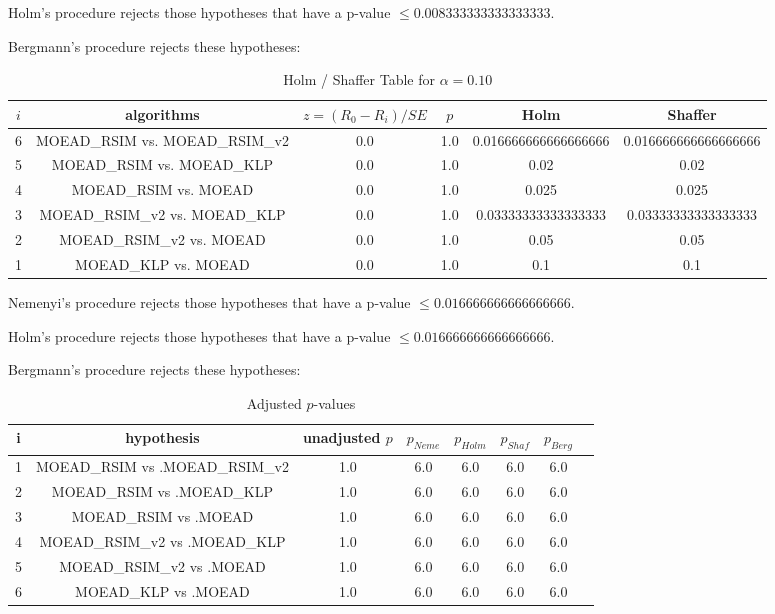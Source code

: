 \documentclass[a4paper,10pt]{article}
\begin{document}
\begin{landscape}
Holm's procedure rejects those hypotheses that have a p-value $\le0.008333333333333333$.


Bergmann's procedure rejects these hypotheses:


\begin{itemize}


\end{itemize}


\begin{table}[!htp]
\centering\tiny
\caption{Holm / Shaffer Table for $\alpha=0.10$}
\begin{tabular}{cccccc}
$i$&algorithms&$z=(R_0 - R_i)/SE$&$p$&Holm&Shaffer\\
\hline
6&MOEAD_RSIM vs. MOEAD_RSIM_v2&0.0&1.0&0.016666666666666666&0.016666666666666666\\
5&MOEAD_RSIM vs. MOEAD_KLP&0.0&1.0&0.02&0.02\\
4&MOEAD_RSIM vs. MOEAD&0.0&1.0&0.025&0.025\\
3&MOEAD_RSIM_v2 vs. MOEAD_KLP&0.0&1.0&0.03333333333333333&0.03333333333333333\\
2&MOEAD_RSIM_v2 vs. MOEAD&0.0&1.0&0.05&0.05\\
1&MOEAD_KLP vs. MOEAD&0.0&1.0&0.1&0.1\\
\hline
\end{tabular}
\end{table}
Nemenyi's procedure rejects those hypotheses that have a p-value $\le0.016666666666666666$.


Holm's procedure rejects those hypotheses that have a p-value $\le0.016666666666666666$.


Bergmann's procedure rejects these hypotheses:


\begin{itemize}


\end{itemize}


\begin{table}[!htp]
\centering\tiny
\caption{Adjusted $p$-values}
\begin{tabular}{cccccccc}
i&hypothesis&unadjusted $p$&$p_{Neme}$&$p_{Holm}$&$p_{Shaf}$&$p_{Berg}$\\
\hline
1&MOEAD_RSIM vs .MOEAD_RSIM_v2&1.0&6.0&6.0&6.0&6.0\\
2&MOEAD_RSIM vs .MOEAD_KLP&1.0&6.0&6.0&6.0&6.0\\
3&MOEAD_RSIM vs .MOEAD&1.0&6.0&6.0&6.0&6.0\\
4&MOEAD_RSIM_v2 vs .MOEAD_KLP&1.0&6.0&6.0&6.0&6.0\\
5&MOEAD_RSIM_v2 vs .MOEAD&1.0&6.0&6.0&6.0&6.0\\
6&MOEAD_KLP vs .MOEAD&1.0&6.0&6.0&6.0&6.0\\
\hline
\end{tabular}
\end{table}

\end{landscape}
\end{document}
